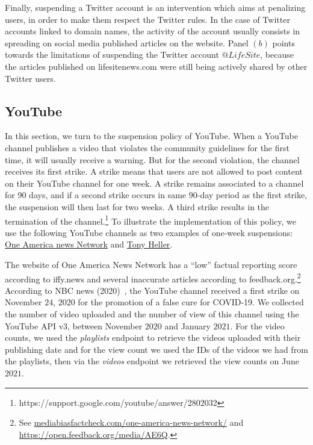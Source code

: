 \documentclass{article}
\begin{document}
Finally, suspending a Twitter account is an intervention which aims at penalizing users, in order to make them respect the Twitter rules. In the case of Twitter accounts linked to domain names, the activity of the account usually consists in spreading on social media published articles on the website. Panel $(b)$ points towards the limitations of suspending the Twitter account $@LifeSite$, because the 
articles published on lifesitenews.com were still being actively shared by other Twitter users.

\subsection{YouTube}

In this section, we turn to the suspension policy of YouTube. 
When a YouTube channel publishes a video that violates the community guidelines for the first time, it will usually receive a warning. 
But for the second violation, the channel receives its first strike.
A strike means that users are not allowed to post content on their YouTube channel for one week.
A strike remains associated to a channel for 90 days, and if a second strike occurs in same 90-day period as the first strike, the suspension will then last for two weeks.
A third strike results in the termination of the channel.\footnote{https://support.google.com/youtube/answer/2802032}
To illustrate the implementation of this policy, we use the following YouTube channels as two examples of  one-week suspensions: \href{https://www.youtube.com/channel/UCNbIDJNNgaRrXOD7VllIMRQ}{One America news Network} and \href{https://www.youtube.com/user/TonyHeller1}{Tony Heller}.

\smallskip

The website of One America News Network has a ``low'' factual reporting score according to iffy.news and several inaccurate articles according to feedback.org.\footnote{See \href{https://mediabiasfactcheck.com/one-america-news-network/}{mediabiasfactcheck.com/one-america-news-network/} and \href{https://open.feedback.org/media/AE6Q}{https://open.feedback.org/media/AE6Q}.}  
According to NBC news (2020)~\cite{nbcnews}, the YouTube channel received a first strike on November $24$, $2020$ for the promotion of a false cure for COVID-19.
We collected the number of video uploaded and the number of view of this channel using the YouTube API v3, between November $2020$ and January $2021$. For the video counts, we used the {\it playlists} endpoint to retrieve the videos uploaded with their publishing date and for the view count we used the IDs of the videos we had from the playlists, then via the {\it videos} endpoint we retrieved the view counts on June $2021$.
\end{document}
